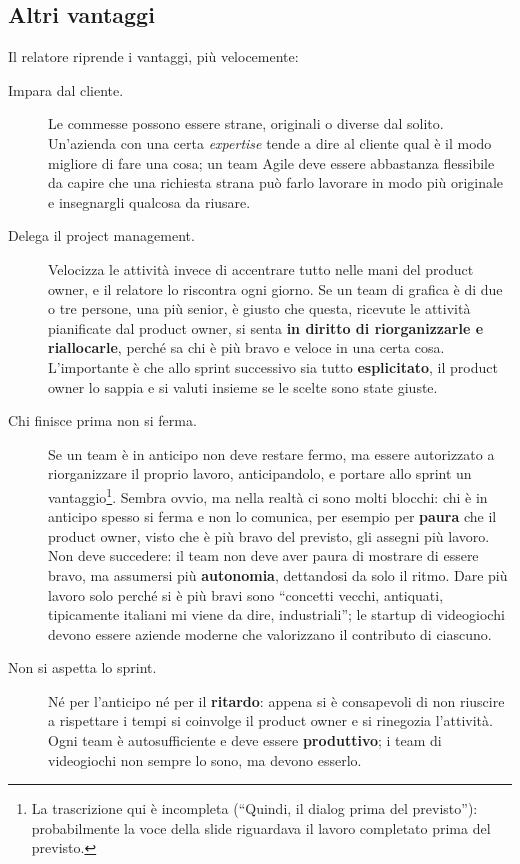 \subsection{Altri vantaggi}

Il relatore riprende i vantaggi, più velocemente:
\begin{description}
  \item[Impara dal cliente.] Le commesse possono essere strane, originali o
        diverse dal solito. Un'azienda con una certa \emph{expertise} tende a
        dire al cliente qual è il modo migliore di fare una cosa; un team Agile
        deve essere abbastanza flessibile da capire che una richiesta strana può
        farlo lavorare in modo più originale e insegnargli qualcosa da riusare.
  \item[Delega il project management.] Velocizza le attività invece di
        accentrare tutto nelle mani del product owner, e il relatore lo
        riscontra ogni giorno. Se un team di grafica è di due o tre persone, una
        più senior, è giusto che questa, ricevute le attività pianificate dal
        product owner, si senta \textbf{in diritto di riorganizzarle e
        riallocarle}, perché sa chi è più bravo e veloce in una certa cosa.
        L'importante è che allo sprint successivo sia tutto
        \textbf{esplicitato}, il product owner lo sappia e si valuti insieme se
        le scelte sono state giuste.
  \item[Chi finisce prima non si ferma.] Se un team è in anticipo non deve
        restare fermo, ma essere autorizzato a riorganizzare il proprio lavoro,
        anticipandolo, e portare allo sprint un vantaggio\footnote{La
        trascrizione qui è incompleta (``Quindi, il dialog prima del
        previsto''): probabilmente la voce della slide riguardava il lavoro
        completato prima del previsto.}. Sembra ovvio, ma nella realtà ci sono
        molti blocchi: chi è in anticipo spesso si ferma e non lo comunica, per
        esempio per \textbf{paura} che il product owner, visto che è più bravo
        del previsto, gli assegni più lavoro. Non deve succedere: il team non
        deve aver paura di mostrare di essere bravo, ma assumersi più
        \textbf{autonomia}, dettandosi da solo il ritmo. Dare più lavoro solo
        perché si è più bravi sono ``concetti vecchi, antiquati, tipicamente
        italiani mi viene da dire, industriali''; le startup di videogiochi
        devono essere aziende moderne che valorizzano il contributo di ciascuno.
  \item[Non si aspetta lo sprint.] Né per l'anticipo né per il
        \textbf{ritardo}: appena si è consapevoli di non riuscire a rispettare
        i tempi si coinvolge il product owner e si rinegozia l'attività. Ogni
        team è autosufficiente e deve essere \textbf{produttivo}; i team di
        videogiochi non sempre lo sono, ma devono esserlo.
\end{description}

